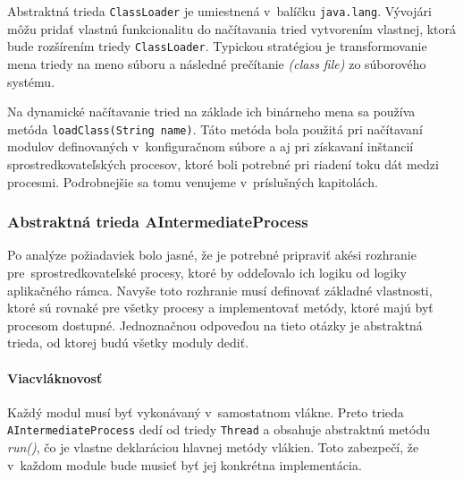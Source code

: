 Abstraktná trieda \verb|ClassLoader| je umiestnená v~balíčku \verb|java.lang|. Vývojári môžu pridať 
vlastnú 
funkcionalitu do načítavania tried vytvorením vlastnej, ktorá bude rozšírením triedy 
\verb|ClassLoader|. Typickou stratégiou je transformovanie mena triedy na meno súboru a následné 
prečítanie  \emph{(class file)} zo súborového systému. \citep{christudas, classloader}

Na dynamické načítavanie tried na základe ich binárneho mena sa používa metóda \verb|loadClass(String name)|.
Táto metóda bola použitá pri načítavaní modulov definovaných v~konfiguračnom súbore a aj pri získavaní 
inštancií sprostredkovateľských procesov, ktoré boli potrebné pri riadení toku dát medzi procesmi.
Podrobnejšie sa tomu venujeme v~príslušných kapitolách. 



\subsubsection{Abstraktná trieda AIntermediateProcess} 

Po analýze požiadaviek bolo jasné, že je potrebné pripraviť akési rozhranie pre~sprostredkovateľské 
procesy, ktoré by oddeľovalo ich logiku od logiky aplikačného rámca. Navyše toto rozhranie musí 
definovať základné vlastnosti, ktoré sú rovnaké pre všetky procesy a implementovať metódy, ktoré 
majú byť procesom dostupné. Jednoznačnou odpoveďou na tieto otázky je abstraktná trieda, 
od ktorej budú všetky moduly dediť. 


\paragraph{Viacvláknovosť}
Každý modul musí byť vykonávaný v~samostatnom vlákne. Preto trieda \verb|AIntermediateProcess| dedí
od triedy \verb|Thread| a obsahuje abstraktnú metódu \emph{run()}, čo je vlastne deklaráciou 
hlavnej metódy vlákien. Toto zabezpečí, že v~každom module bude musieť byť jej konkrétna implementácia.


